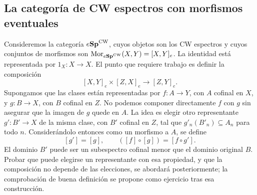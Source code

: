 \subsection{La categoría de CW espectros con morfismos eventuales}

Consideremos la categoría $e\mathbf{Sp}^{\mathrm{CW}}$, cuyos objetos son los CW espectros y cuyos conjuntos de morfismos son $\operatorname{Mor}_{e\mathbf{Sp}^{\mathrm{CW}}}(X,Y)=[X,Y]_e$. La identidad está representada por $1_X\colon X\to X$. El punto que requiere trabajo es definir la composición
\[
[X,Y]_e\times[Z,X]_e\longrightarrow[Z,Y]_e.
\]
Supongamos que las clases están representadas por $f\colon A\to Y$, con $A$ cofinal en $X$, y $g\colon B\to X$, con $B$ cofinal en $Z$. No podemos componer directamente $f$ con $g$ sin asegurar que la imagen de $g$ quede en $A$. La idea es elegir otro representante $g'\colon B'\to X$ de la misma clase, con $B'$ cofinal en $Z$, tal que $g'_n(B'_n)\subseteq A_n$ para todo $n$. Considerándolo entonces como un morfismo a $A$, se define
\[
[g']=[g],\qquad ([f]\circ[g])=[f\circ g'].
\]
El dominio $B'$ puede ser un subespectro cofinal menor que el dominio original $B$. Probar que puede elegirse un representante con esa propiedad, y que la composición no depende de las elecciones, se abordará posteriormente; la comprobación de buena definición se propone como ejercicio tras esa construcción.

